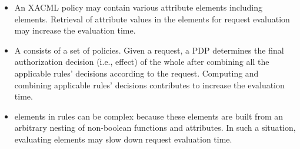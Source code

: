 \begin{itemize}
\item An XACML policy may contain various attribute elements including  elements. Retrieval of
attribute values in the  elements for request evaluation may increase the evaluation time.
\item A  consists of a set of policies. Given a request, a PDP determines the final authorization decision (i.e., effect) of the whole  after combining all the applicable rules' decisions according to the request.
Computing and combining applicable rules' decisions contributes to increase the evaluation time.
\item {} elements in rules can be complex because these elements are built from an arbitrary nesting of non-boolean functions and attributes. In such a situation, evaluating  elements may slow down request evaluation time.
\end{itemize}

